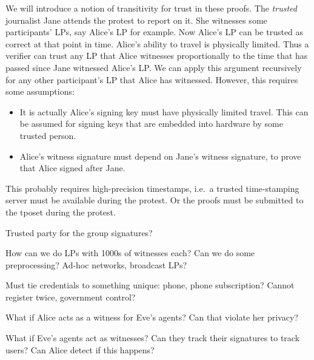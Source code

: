 We will introduce a notion of transitivity for trust in these proofs.
The \emph{trusted} journalist Jane attends the protest to report on it.
She witnesses some participants' \acp{LP}, say Alice's \ac{LP} for example.
Now Alice's \ac{LP} can be trusted as correct at that point in time.
Alice's ability to travel is physically limited.
Thus a verifier can trust any \ac{LP} that Alice witnesses proportionally to 
the time that has passed since Jane witnessed Alice's \ac{LP}.
We can apply this argument recursively for any other participant's \ac{LP} that 
Alice has witnessed.
However, this requires some assumptions:
\begin{itemize}
  \item It is actually Alice's signing key must have physically limited travel.
    This can be assumed for signing keys that are embedded into hardware by 
    some trusted person.
  \item Alice's witness signature must depend on Jane's witness signature, to 
    prove that Alice signed after Jane.
\end{itemize}
\begin{remark}
  This probably requires high-precision timestamps, i.e.\ a trusted 
  time-stamping server must be available during the protest.
  Or the proofs must be submitted to the \ac{tposet} during the protest.
\end{remark}

\begin{question}
  Trusted party for the group signatures?
\end{question}
\begin{question}
  How can we do \acp{LP} with 1000s of witnesses each?
  Can we do some preprocessing?
  Ad-hoc networks, broadcast \acp{LP}?
\end{question}
\begin{question}
  Must tie credentials to something unique: phone, phone subscription?
  Cannot register twice, government control?
\end{question}

\begin{question}
  What if Alice acts as a witness for Eve's agents?
  Can that violate her privacy?
\end{question}
\begin{question}
  What if Eve's agents act as witnesses?
  Can they track their signatures to track users?
  Can Alice detect if this happens?
\end{question}

